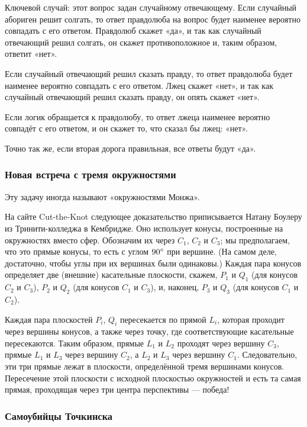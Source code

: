 Ключевой случай: этот вопрос задан случайному отвечающему.
Если случайный абориген решит солгать, то ответ правдолюба на вопрос будет наименее вероятно совпадать с его ответом.
Правдолюб скажет «да», и так как случайный отвечающий решил солгать, он скажет противоположное и, таким образом, ответит «нет».

Если случайный отвечающий решил сказать правду, то ответ правдолюба будет наименее вероятно совпадать с его ответом.
Лжец скажет «нет», и так как случайный отвечающий решил сказать правду, он опять скажет «нет».

Если логик обращается к правдолюбу, то ответ лжеца наименее вероятно совпадёт с его ответом, и он скажет то, что сказал бы лжец: «нет».

Точно так же, если вторая дорога правильная, все ответы будут «да».

\subsubsection*{Новая встреча с тремя окружностями}

Эту задачу иногда называют «окружностями Монжа».

На сайте Cut-the-Knot \cite{cut-the-knot} следующее доказательство приписывается Натану Боулеру из Тринити-колледжа в Кембридже.
Оно использует конусы, построенные на окружностях вместо сфер.
Обозначим их через $C_1$, $C_2$ и $C_3$; мы предполагаем, что это прямые конусы, то есть с углом $90\degree$ при вершине.
(На самом деле, достаточно, чтобы углы при их вершинах были одинаковы.)
Каждая пара конусов определяет две (внешние) касательные плоскости, скажем, $P_1$ и $Q_1$ (для конусов $C_2$ и $C_3$), $P_2$ и $Q_2$ (для конусов $C_1$ и $C_3$), и, наконец, $P_3$ и $Q_3$ (для конусов $C_1$ и $C_2$).

Каждая пара плоскостей $P_i$, $Q_i$ пересекается по прямой $L_i$, которая проходит через вершины конусов, а также через точку, где соответствующие касательные пересекаются.
Таким образом, прямые $L_1$ и $L_2$ проходят через вершину $C_3$,
прямые $L_1$ и $L_3$ через вершину $C_2$,
а $L_2$ и $L_3$ через вершину $C_1$.
Следовательно, эти три прямые лежат в плоскости, определённой тремя вершинами конусов. Пересечение этой плоскости с исходной плоскостью окружностей и есть та самая прямая, проходящая через три центра перспективы --- победа!

\subsubsection*{Самоубийцы Точкинска}

